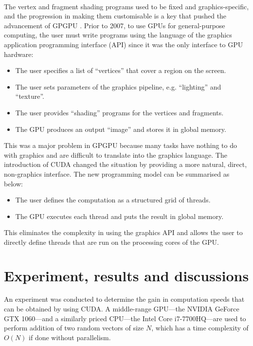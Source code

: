 \documentclass[12pt, twocolumn]{report}
\begin{document}
\paragraph{}
The vertex and fragment shading programs used to be fixed and graphics-specific, and the progression in making them customisable is a key that pushed the advancement of GPGPU \cite{GPU computing}. Prior to 2007, to use GPUs for general-purpose computing, the user must write programs using the language of the graphics application programming interface (API) since it was the only interface to GPU hardware:
\begin{itemize}
    \item The user specifies a list of ``vertices'' that cover a region on the screen.
    \item The user sets parameters of the graphics pipeline, e.g. ``lighting'' and ``texture''.
    \item The user provides ``shading'' programs for the vertices and fragments.
    \item The GPU produces an output ``image'' and stores it in global memory.
\end{itemize}
This was a major problem in GPGPU because many tasks have nothing to do with graphics and are difficult to translate into the graphics language. The introduction of CUDA changed the situation by providing a more natural, direct, non-graphics interface. The new programming model can be summarised as below:
\begin{itemize}
    \item The user defines the computation as a structured grid of threads.
    \item The GPU executes each thread and puts the result in global memory.
\end{itemize}
This eliminates the complexity in using the graphics API and allows the user to directly define threads that are run on the processing cores of the GPU.

\section{Experiment, results and discussions}
\paragraph{}
An experiment was conducted to determine the gain in computation speeds that can be obtained by using CUDA. A middle-range GPU---the NVIDIA GeForce GTX 1060---and a similarly priced CPU---the Intel Core i7-7700HQ---are used to perform addition of two random vectors of size $N$, which has a time complexity of $O(N)$ if done without parallelism.
\end{document}
